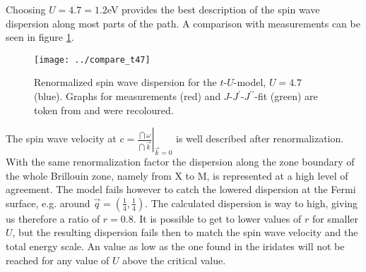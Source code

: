 Choosing $U=4.7 = 1.2$eV provides the best description of the spin wave dispersion along most parts of the path.
A comparison with measurements can be seen in figure \ref{tU47}. 
%
\begin{figure}
 \begin{center}
  \texttt{[image: ../compare\_t47]}
  \caption{Renormalized spin wave dispersion for the $t$-$U$-model, $U=4.7$ (blue). Graphs for measurements (red) and $J$-$J^{\prime}$-$J^{\prime \prime}$-fit (green) are
	    token from \cite{PhysRevLett.106.136402} and were recoloured.}
 \label{tU47}
 \end{center}
\end{figure}
%
The spin wave velocity at $c=\left. \frac{\dint \omega}{\dint \vec k} \right|_{\vec k = 0}$ is well described after renormalization.
With the same renormalization factor the dispersion along
the zone boundary of the whole Brillouin zone, namely from X to M, is represented at a high level of agreement.
The model fails however to catch the lowered dispersion at the Fermi surface, e.g. around $\vec q = (\frac 14, \frac14)$.
The calculated dispersion is way to high, giving us therefore a ratio of $r=0.8$. 
It is possible to get to lower values of $r$ for smaller $U$, but the resulting dispersion fails then to match the spin wave velocity and 
the total energy scale. An value as low as the one found in the iridates will not be reached for any value of $U$ above the critical value.


